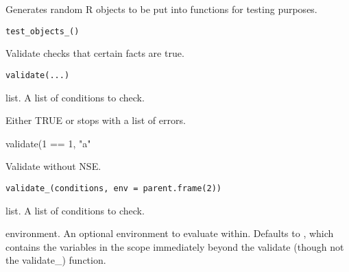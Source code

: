 \documentclass[a4paper]{book}
\begin{document}
%
\begin{Description}\relax
Generates random R objects to be put into functions for testing purposes.
\end{Description}
%
\begin{Usage}
\begin{verbatim}
test_objects_()
\end{verbatim}
\end{Usage}
%
\begin{Description}\relax
Validate checks that certain facts are true.
\end{Description}
%
\begin{Usage}
\begin{verbatim}
validate(...)
\end{verbatim}
\end{Usage}
%
\begin{Arguments}
\begin{ldescription}
\item[\code{...}] list. A list of conditions to check.
\end{ldescription}
\end{Arguments}
%
\begin{Value}
Either TRUE or stops with a list of errors.
\end{Value}
%
\begin{Examples}
\begin{ExampleCode}
  validate(1 == 1, "a" %
\end{ExampleCode}
\end{Examples}
%
\begin{Description}\relax
Validate without NSE.
\end{Description}
%
\begin{Usage}
\begin{verbatim}
validate_(conditions, env = parent.frame(2))
\end{verbatim}
\end{Usage}
%
\begin{Arguments}
\begin{ldescription}
\item[\code{conditions}] list. A list of conditions to check.

\item[\code{env}] environment. An optional environment to evaluate within. Defaults to
, which contains the variables in the scope immediately beyond
the validate (though not the validate\_) function.
\end{ldescription}
\end{Arguments}
\end{document}
